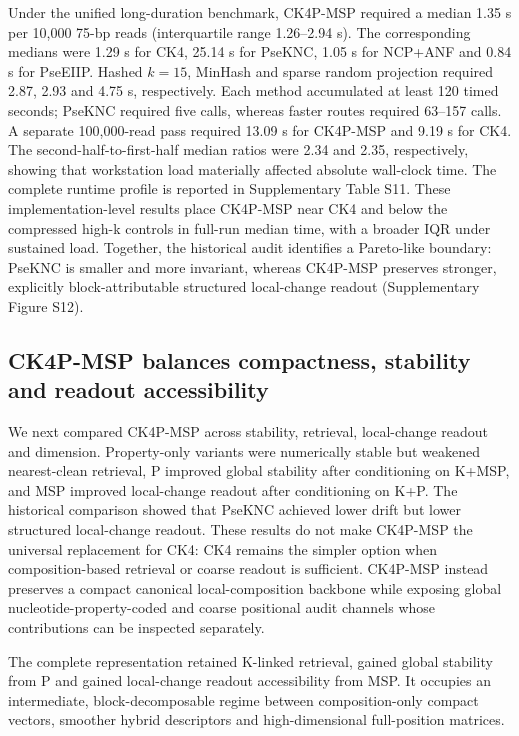 Under the unified long-duration benchmark, CK4P-MSP required a median 1.35 s per 10,000 75-bp reads (interquartile range 1.26--2.94 s). The corresponding medians were 1.29 s for CK4, 25.14 s for PseKNC, 1.05 s for NCP+ANF and 0.84 s for PseEIIP. Hashed $k=15$, MinHash and sparse random projection required 2.87, 2.93 and 4.75 s, respectively. Each method accumulated at least 120 timed seconds; PseKNC required five calls, whereas faster routes required 63--157 calls. A separate 100,000-read pass required 13.09 s for CK4P-MSP and 9.19 s for CK4. The second-half-to-first-half median ratios were 2.34 and 2.35, respectively, showing that workstation load materially affected absolute wall-clock time. The complete runtime profile is reported in Supplementary Table S11. These implementation-level results place CK4P-MSP near CK4 and below the compressed high-k controls in full-run median time, with a broader IQR under sustained load. Together, the historical audit identifies a Pareto-like boundary: PseKNC is smaller and more invariant, whereas CK4P-MSP preserves stronger, explicitly block-attributable structured local-change readout (Supplementary Figure S12).

\subsection{CK4P-MSP balances compactness, stability and readout accessibility}

We next compared CK4P-MSP across stability, retrieval, local-change readout and dimension. Property-only variants were numerically stable but weakened nearest-clean retrieval, P improved global stability after conditioning on K+MSP, and MSP improved local-change readout after conditioning on K+P. The historical comparison showed that PseKNC achieved lower drift but lower structured local-change readout. These results do not make CK4P-MSP the universal replacement for CK4: CK4 remains the simpler option when composition-based retrieval or coarse readout is sufficient. CK4P-MSP instead preserves a compact canonical local-composition backbone while exposing global nucleotide-property-coded and coarse positional audit channels whose contributions can be inspected separately.

The complete representation retained K-linked retrieval, gained global stability from P and gained local-change readout accessibility from MSP. It occupies an intermediate, block-decomposable regime between composition-only compact vectors, smoother hybrid descriptors and high-dimensional full-position matrices.

